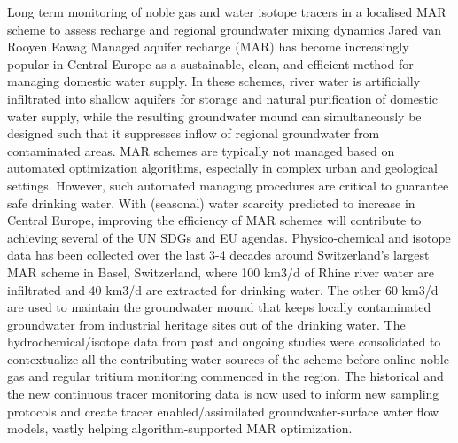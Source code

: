 \begin{conf-abstract}
{Long term monitoring of noble gas and water isotope tracers in a localised MAR scheme to assess recharge and regional groundwater mixing dynamics}
{	Jared van Rooyen}
{Eawag}
{Managed aquifer recharge (MAR) has become increasingly popular in Central Europe as a sustainable, clean, and efficient method for managing domestic water supply. In these schemes, river water is artificially infiltrated into shallow aquifers for storage and natural purification of domestic water supply, while the resulting groundwater mound can simultaneously be designed such that it suppresses inflow of regional groundwater from contaminated areas. MAR schemes are typically not managed based on automated optimization algorithms, especially in complex urban and geological settings. However, such automated managing procedures are critical to guarantee safe drinking water. With (seasonal) water scarcity predicted to increase in Central Europe, improving the efficiency of MAR schemes will contribute to achieving several of the UN SDGs and EU agendas. Physico-chemical and isotope data has been collected over the last 3-4 decades around Switzerland’s largest MAR scheme in Basel, Switzerland, where 100 km3/d of Rhine river water are infiltrated and 40 km3/d are extracted for drinking water. The other 60 km3/d are used to maintain the groundwater mound that keeps locally contaminated groundwater from industrial heritage sites out of the drinking water. The hydrochemical/isotope data from past and ongoing studies were consolidated to contextualize all the contributing water sources of the scheme before online noble gas and regular tritium monitoring commenced in the region. The historical and the new continuous tracer monitoring data is now used to inform new sampling protocols and create tracer enabled/assimilated groundwater-surface water flow models, vastly helping algorithm-supported MAR optimization.}
\end{conf-abstract}
